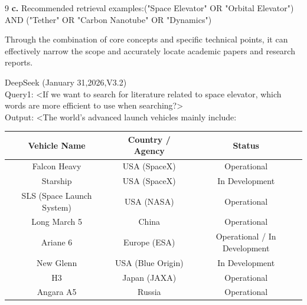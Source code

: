 \documentclass[12pt]{mcmthesis}
\begin{document}
\begin{ReportAiUse}{9}
    \textbf{c.}	Recommended retrieval examples:("Space Elevator" OR "Orbital Elevator") AND ("Tether" OR "Carbon Nanotube" OR "Dynamics")

    Through the combination of core concepts and specific technical points, it can effectively narrow the scope and accurately locate academic papers and research reports.

    DeepSeek (January 31,2026,V3.2)\\
    Query1: <If we want to search for literature related to space elevator, which words are more efficient to use when searching?>\\
    Output: <The world's advanced launch vehicles mainly include:

    \begin{table}[htbp]
        \centering
        \label{tab:advanced_rockets}
        \begin{tabular}{|c|c|c|}
            \hline
            \textbf{Vehicle Name}     & \textbf{Country / Agency} & \textbf{Status}              \\
            \hline
            Falcon Heavy              & USA (SpaceX)              & Operational                  \\
            \hline
            Starship                  & USA (SpaceX)              & In Development               \\
            \hline
            SLS (Space Launch System) & USA (NASA)                & Operational                  \\
            \hline
            Long March 5              & China                     & Operational                  \\
            \hline
            Ariane 6                  & Europe (ESA)              & Operational / In Development \\
            \hline
            New Glenn                 & USA (Blue Origin)         & In Development               \\
            \hline
            H3                        & Japan (JAXA)              & Operational                  \\
            \hline
            Angara A5                 & Russia                    & Operational                  \\
            \hline
        \end{tabular}
    \end{table}

\end{ReportAiUse}
\end{document}
